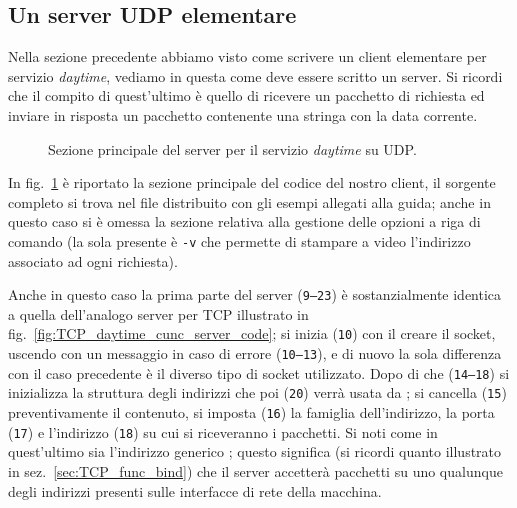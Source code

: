 \subsection{Un server UDP elementare}
\label{sec:UDP_daytime_server}

Nella sezione precedente abbiamo visto come scrivere un client elementare per
servizio \textit{daytime}, vediamo in questa come deve essere scritto un
server.  Si ricordi che il compito di quest'ultimo è quello di ricevere un
pacchetto di richiesta ed inviare in risposta un pacchetto contenente una
stringa con la data corrente. 

\begin{figure}[!htbp] 
  \footnotesize \centering
  \begin{minipage}[c]{\codesamplewidth}
  \end{minipage} 
  \normalsize
  \caption{Sezione principale del server per il servizio \textit{daytime} su
    UDP.}
  \label{fig:UDP_daytime_server}
\end{figure}

In fig.~\ref{fig:UDP_daytime_server} è riportato la sezione principale del
codice del nostro client, il sorgente completo si trova nel file
 distribuito con gli esempi allegati alla guida; anche
in questo caso si è omessa la sezione relativa alla gestione delle opzioni a
riga di comando (la sola presente è \texttt{-v} che permette di stampare a
video l'indirizzo associato ad ogni richiesta).

Anche in questo caso la prima parte del server (\texttt{\small 9--23}) è
sostanzialmente identica a quella dell'analogo server per TCP illustrato in
fig.~\ref{fig:TCP_daytime_cunc_server_code}; si inizia (\texttt{\small 10})
con il creare il socket, uscendo con un messaggio in caso di errore
(\texttt{\small 10--13}), e di nuovo la sola differenza con il caso precedente
è il diverso tipo di socket utilizzato. Dopo di che (\texttt{\small 14--18})
si inizializza la struttura degli indirizzi che poi (\texttt{\small 20}) verrà
usata da ; si cancella (\texttt{\small 15}) preventivamente il
contenuto, si imposta (\texttt{\small 16}) la famiglia dell'indirizzo, la
porta (\texttt{\small 17}) e l'indirizzo (\texttt{\small 18}) su cui si
riceveranno i pacchetti.  Si noti come in quest'ultimo sia l'indirizzo
generico ; questo significa (si ricordi quanto illustrato
in sez.~\ref{sec:TCP_func_bind}) che il server accetterà pacchetti su uno
qualunque degli indirizzi presenti sulle interfacce di rete della macchina.

